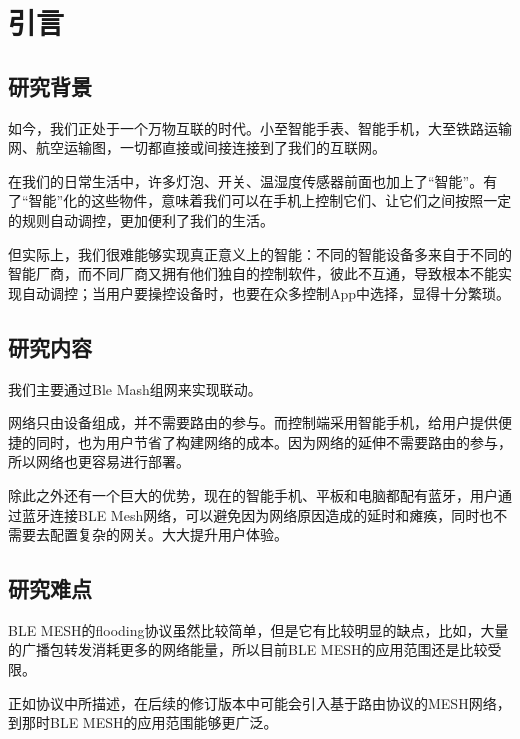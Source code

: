 \chapter{引言}

\section{研究背景}
如今，我们正处于一个万物互联的时代。小至智能手表、智能手机，大至铁路运输网、航空运输图，一切都直接或间接连接到了我们的互联网。

在我们的日常生活中，许多灯泡、开关、温湿度传感器前面也加上了“智能”。有了“智能”化的这些物件，意味着我们可以在手机上控制它们、让它们之间按照一定的规则自动调控，更加便利了我们的生活。

但实际上，我们很难能够实现真正意义上的智能：不同的智能设备多来自于不同的智能厂商，而不同厂商又拥有他们独自的控制软件，彼此不互通，导致根本不能实现自动调控；当用户要操控设备时，也要在众多控制App中选择，显得十分繁琐。

\section{研究内容}
我们主要通过Ble Mash组网来实现联动。

网络只由设备组成，并不需要路由的参与。而控制端采用智能手机，给用户提供便捷的同时，也为用户节省了构建网络的成本。因为网络的延伸不需要路由的参与，所以网络也更容易进行部署。

除此之外还有一个巨大的优势，现在的智能手机、平板和电脑都配有蓝牙，用户通过蓝牙连接BLE Mesh网络，可以避免因为网络原因造成的延时和瘫痪，同时也不需要去配置复杂的网关。大大提升用户体验。

\section{研究难点}
BLE MESH的flooding协议虽然比较简单，但是它有比较明显的缺点，比如，大量的广播包转发消耗更多的网络能量，所以目前BLE MESH的应用范围还是比较受限。

正如协议中所描述，在后续的修订版本中可能会引入基于路由协议的MESH网络，到那时BLE MESH的应用范围能够更广泛。
